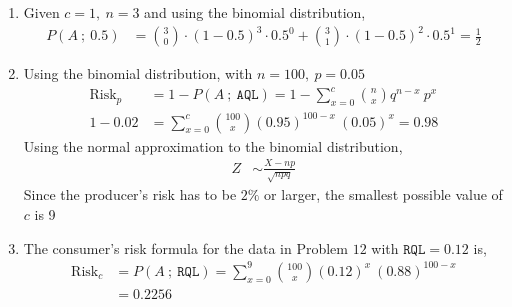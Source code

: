 \begin{enumerate}
    \item Given $ c = 1,\ n = 3$ and using the binomial distribution,
          \begin{align}
              P(A\ ;\ 0.5) & = \binom{3}{0} \cdot (1-0.5)^3 \cdot 0.5^0
              + \binom{3}{1} \cdot (1-0.5)^2 \cdot 0.5^1 = \frac{1}{2}
          \end{align}
          \begin{figure}[H]
              \centering
              \anitableeleven
          \end{figure}

    \item Using the binomial distribution, with $ n = 100,\ p = 0.05 $
          \begin{align}
              \text{Risk}_p & = 1 - P(A\ ;\ \texttt{AQL}) = 1 -
              \sum_{x=0}^{c} \binom{n}{x} q^{n-x}\ p^x                       \\
              1 - 0.02      & = \sum_{x=0}^{c} \binom{100}{x} (0.95)^{100-x}
              \ (0.05)^x = 0.98
          \end{align}
          Using the normal approximation to the binomial distribution,
          \begin{align}
              Z & \sim \frac{X - np}{\sqrt{npq}}
          \end{align}
          Since the producer's risk has to be $ 2\% $ or larger, the smallest
          possible value of $ c $ is 9

    \item The consumer's risk formula for the data in Problem $ 12 $  with
          $ \texttt{RQL}  = 0.12 $ is,
          \begin{align}
              \text{Risk}_c & = P(A\ ;\ \texttt{RQL}) = \sum_{x=0}^{9} \binom{100}{x}
              (0.12)^x\ (0.88)^{100-x}                                                \\
                            & = 0.2256
          \end{align}


\end{enumerate}
